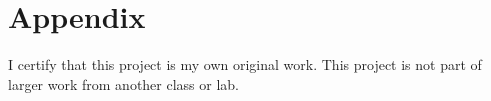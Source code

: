 \documentclass[10pt,twocolumn,letterpaper]{article}
\begin{document}

{\small


}

\section{Appendix}
I certify that this project is my own original work. This project is not part of larger work from another class or lab.

\end{document}
